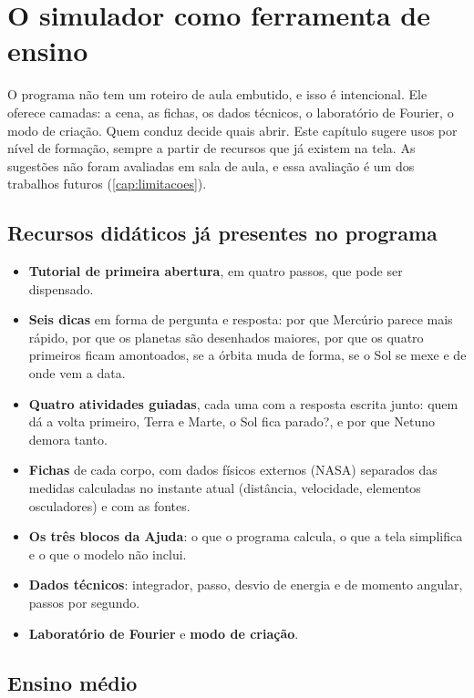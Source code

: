 \chapter{O simulador como ferramenta de ensino}\label{cap:ensino}

O programa não tem um roteiro de aula embutido, e isso é intencional. Ele oferece camadas: a cena, as fichas, os dados técnicos, o laboratório de Fourier, o modo de criação. Quem conduz decide quais abrir. Este capítulo sugere usos por nível de formação, sempre a partir de recursos que já existem na tela. As sugestões não foram avaliadas em sala de aula, e essa avaliação é um dos trabalhos futuros (\autoref{cap:limitacoes}).

\section{Recursos didáticos já presentes no programa}

\begin{itemize}
  \item \textbf{Tutorial de primeira abertura}, em quatro passos, que pode ser dispensado.
  \item \textbf{Seis dicas} em forma de pergunta e resposta: por que Mercúrio parece mais rápido, por que os planetas são desenhados maiores, por que os quatro primeiros ficam amontoados, se a órbita muda de forma, se o Sol se mexe e de onde vem a data.
  \item \textbf{Quatro atividades guiadas}, cada uma com a resposta escrita junto: quem dá a volta primeiro, Terra e Marte, o Sol fica parado?, e por que Netuno demora tanto.
  \item \textbf{Fichas} de cada corpo, com dados físicos externos (NASA) separados das medidas calculadas no instante atual (distância, velocidade, elementos osculadores) e com as fontes.
  \item \textbf{Os três blocos da Ajuda}: o que o programa calcula, o que a tela simplifica e o que o modelo não inclui.
  \item \textbf{Dados técnicos}: integrador, passo, desvio de energia e de momento angular, passos por segundo.
  \item \textbf{Laboratório de Fourier} e \textbf{modo de criação}.
\end{itemize}

\section{Ensino médio}

